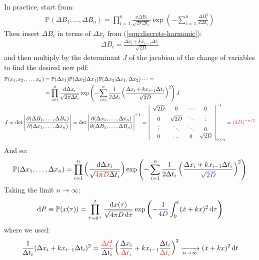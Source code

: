 \documentclass[../template.tex]{subfiles}
\begin{document}
In practice, start from:
\begin{align*}
    \mathbb{P}(\Delta B_1, \dots, \Delta B_n) = \prod_{i=1}^n \frac{\dd{\Delta B_i}}{\sqrt{2 \pi \Delta t_i}} \exp\left(-\sum_{i=1}^n \frac{\Delta B_i^2}{ 2 \Delta t_i} \right) 
\end{align*} 
Then insert $\Delta B_i$ in terms of $\Delta x_i$ from (\ref{eqn:discrete-harmonic}):
\begin{align*}
    \Delta B_i = \frac{\Delta x_i + k x_{i-1} \Delta t_i}{\sqrt{2D}} 
\end{align*}
and then multiply by the determinant $J$ of the jacobian of the change of variables to find the desired new pdf:
\begin{align*}
    \mathbb{P}(x_1, x_2, \dots, x_n) &= \mathbb{P}(\Delta x_1) \mathbb{P}(\Delta x_2 | \Delta x_1) \mathbb{P}(\Delta x_3 | \Delta x_1, \Delta x_2) \cdots =\\
    &= \prod_{i=1}^n \frac{\dd{\Delta x_i}}{\sqrt{2 \pi \Delta t_i}} \exp\left(-\sum_{i=1}^n \frac{1}{2 \Delta t_i} \left(\frac{\Delta x_i + k x_{i-1} \Delta t_i}{\sqrt{2 D}} \right)^2 \right) J\\
    \span
    J = \operatorname{det}\Bigg| \pdv{(\Delta B_1, \dots, \Delta B_n)}{(\Delta x_1, \dots, \Delta x_n)}\Bigg| = \operatorname{det} \Bigg|\pdv{(\Delta x_1, \dots, \Delta x_n)}{(\Delta B_1, \dots, \Delta B_n)}\Bigg|^{-1} = \left|\begin{array}{cccc}
    \sqrt{2D} & 0 & \cdots & 0 \\ 
    0 & \sqrt{2D} & \ddots & \vdots \\ 
    \vdots & \ddots & \ddots & 0 \\ 
    0 & \dots & 0 & \sqrt{2D}
    \end{array}\right|^{-1}_{n \times n} = \textcolor{Red}{(2 D)^{-n/2}}
\end{align*}
And so:
\begin{align} \label{eqn:H1}
    \mathbb{P}(\Delta x_1, \dots, \Delta x_n) = \prod_{i=1}^n \left(\frac{\dd{\Delta x_i}}{\sqrt{\textcolor{Red}{4} \pi \textcolor{Red}{D} \Delta t_i}}\right) \exp\left(-\sum_{i=1}^n \frac{1}{2 \Delta t_i} \left(\frac{\Delta x_i + k x_{i-1} \Delta t_i}{\textcolor{Blue}{\sqrt{2D}}} \right)^2 \right) 
\end{align}
Taking the limit $n \to \infty$:
\begin{align*}
    \dd{P} \equiv 
    \mathbb{P}(x(\tau)) = \prod_{\tau = 0^+}^t \frac{\dd{x(\tau)}}{\sqrt{4 \pi D \dd{\tau}}} \exp\left(-\frac{1}{\textcolor{Blue}{4 D}} \int_0^t (\dot{x} + k x)^2 \dd{\tau} \right) 
\end{align*}
where we used:
\begin{align*}
    \frac{1}{\Delta t_i} (\Delta x_i + k x_{i-1} \Delta t_i)^2 = \frac{\textcolor{Red}{\Delta t_i^2}}{\Delta t_i} \left(\frac{\Delta x_i}{\textcolor{Red}{\Delta t_i}} + k x_{i-1} \frac{\Delta t_i}{\textcolor{Red}{\Delta t_i}}   \right)^2  \xrightarrow[n \to \infty]{}  (\dot{x} + kx)^2 \dd{t}
\end{align*}
\end{document}
